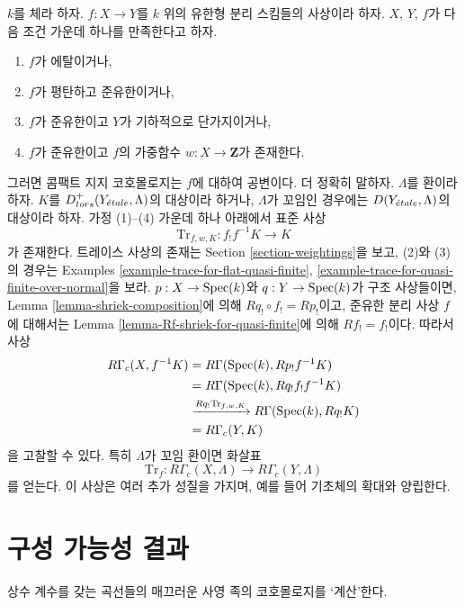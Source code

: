 \begin{remark}
\label{remark-covariance-compactly-supported}
$k$를 체라 하자. $f : X \to Y$를 $k$ 위의 유한형 분리 스킴들의
사상이라 하자. $X$, $Y$, $f$가 다음 조건 가운데 하나를 만족한다고
하자.
\begin{enumerate}
\item $f$가 에탈이거나,
\item $f$가 평탄하고 준유한이거나,
\item $f$가 준유한이고 $Y$가 기하적으로 단가지이거나,
\item $f$가 준유한이고 $f$의 가중함수
$w : X \to \mathbf{Z}$가 존재한다.
\end{enumerate}
그러면 콤팩트 지지 코호몰로지는 $f$에 대하여 공변이다.
더 정확히 말하자. $\Lambda$를 환이라 하자. $K$를
$D^+_{tors}(Y_{\acute{e}tale}, \Lambda)$의 대상이라 하거나,
$\Lambda$가 꼬임인 경우에는 $D(Y_{\acute{e}tale}, \Lambda)$의 대상이라 하자.
가정 (1)--(4) 가운데 하나 아래에서 표준 사상
$$
\text{Tr}_{f, w, K} : f_!f^{-1}K \longrightarrow K
$$
가 존재한다. 트레이스 사상의 존재는 Section
\ref{section-weightings}을 보고, (2)와 (3)의 경우는 Examples
\ref{example-trace-for-flat-quasi-finite},
\ref{example-trace-for-quasi-finite-over-normal}을 보라.
$p : X \to \mathop{\mathrm{Spec}}(k)$와 $q : Y \to \mathop{\mathrm{Spec}}(k)$가 구조 사상들이면,
Lemma \ref{lemma-shriek-composition}에 의해
$Rq_! \circ f_! = Rp_!$이고, 준유한 분리 사상 $f$에 대해서는
Lemma \ref{lemma-Rf-shriek-for-quasi-finite}에 의해
$Rf_! = f_!$이다. 따라서 사상
\begin{align*}
R\Gamma_c(X, f^{-1}K)
& =
R\Gamma(\mathop{\mathrm{Spec}}(k), Rp_!f^{-1}K) \\
& =
R\Gamma(\mathop{\mathrm{Spec}}(k), Rq_!f_!f^{-1}K) \\
& \xrightarrow{Rq_!\text{Tr}_{f, w, K}}
R\Gamma(\mathop{\mathrm{Spec}}(k), Rq_!K) \\
& =
R\Gamma_c(Y, K)
\end{align*}
을 고찰할 수 있다. 특히 $\Lambda$가 꼬임 환이면 화살표
$$
\text{Tr}_f : R\Gamma_c(X, \Lambda) \longrightarrow R\Gamma_c(Y, \Lambda)
$$
를 얻는다. 이 사상은 여러 추가 성질을 가지며, 예를 들어 기초체의
확대와 양립한다.
\end{remark}


\section{구성 가능성 결과}
\label{section-family-smooth-curves-cohomology}

\noindent
상수 계수를 갖는 곡선들의 매끄러운 사영 족의 코호몰로지를
‘계산’한다.

